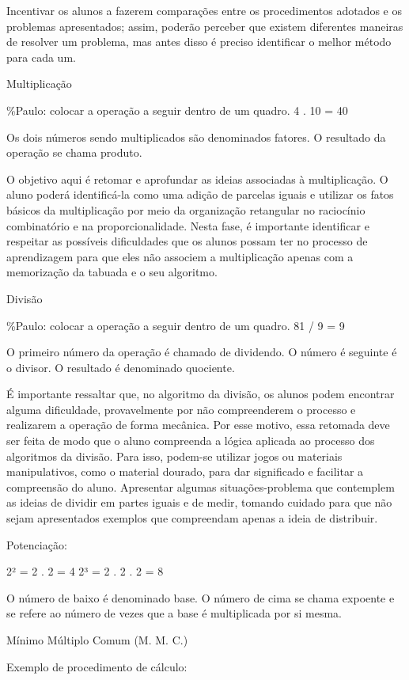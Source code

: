 Incentivar os alunos a fazerem comparações entre os procedimentos
adotados e os problemas apresentados; assim, poderão perceber que
existem diferentes maneiras de resolver um problema, mas antes disso é
preciso identificar o melhor método para cada um.

Multiplicação

\%Paulo: colocar a operação a seguir dentro de um quadro. 4 . 10 = 40

Os dois números sendo multiplicados são denominados fatores. O resultado
da operação se chama produto.

O objetivo aqui é retomar e aprofundar as ideias associadas à
multiplicação. O aluno poderá identificá-la como uma adição de parcelas
iguais e utilizar os fatos básicos da multiplicação por meio da
organização retangular no raciocínio combinatório e na
proporcionalidade. Nesta fase, é importante identificar e respeitar as
possíveis dificuldades que os alunos possam ter no processo de
aprendizagem para que eles não associem a multiplicação apenas com a
memorização da tabuada e o seu algoritmo.

Divisão

\%Paulo: colocar a operação a seguir dentro de um quadro. 81 / 9 = 9

O primeiro número da operação é chamado de dividendo. O número é
seguinte é o divisor. O resultado é denominado quociente.

É importante ressaltar que, no algoritmo da divisão, os alunos podem
encontrar alguma dificuldade, provavelmente por não compreenderem o
processo e realizarem a operação de forma mecânica. Por esse motivo,
essa retomada deve ser feita de modo que o aluno compreenda a lógica
aplicada ao processo dos algoritmos da divisão. Para isso, podem-se
utilizar jogos ou materiais manipulativos, como o material dourado, para
dar significado e facilitar a compreensão do aluno. Apresentar algumas
situações-problema que contemplem as ideias de dividir em partes iguais
e de medir, tomando cuidado para que não sejam apresentados exemplos que
compreendam apenas a ideia de distribuir.

Potenciação:

2² = 2 . 2 = 4 2³ = 2 . 2 . 2 = 8

O número de baixo é denominado base. O número de cima se chama expoente
e se refere ao número de vezes que a base é multiplicada por si mesma.

Mínimo Múltiplo Comum (M. M. C.)

Exemplo de procedimento de cálculo:

